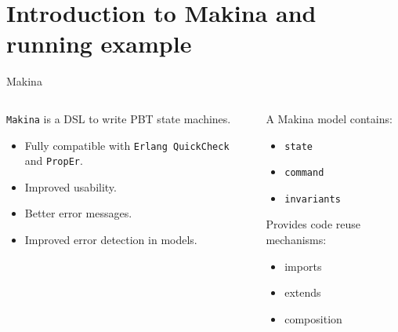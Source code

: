 \documentclass[aspectratio=169, 10pt]{beamer}
\begin{document}
\section{Introduction to Makina and running example}
\label{sec:org9d1ef4c}
\begin{frame}[label={sec:org6fdfc9e},fragile]{Makina}
 \begin{columns}
\begin{column}{0.48\columnwidth}
\onslide<+->
\texttt{Makina} is a DSL to write PBT state machines.
\onslide<+->
\begin{itemize}
\item Fully compatible with \texttt{Erlang QuickCheck} and \texttt{PropEr}.
\onslide<+->
\item Improved usability.
\onslide<+->
\item Better error messages.
\onslide<+->
\item Improved error detection in models.
\end{itemize}
\end{column}

\begin{column}{0.48\columnwidth}
\onslide<+->
A Makina model contains:
\onslide<+->
\begin{itemize}
\item \texttt{state}
\onslide<+->
\item \texttt{command}
\onslide<+->
\item \texttt{invariants}
\onslide<+->
\end{itemize}

\vspace{10pt}

Provides code reuse mechanisms:
\onslide<+->
\begin{itemize}
\item imports
\onslide<+->
\item extends
\onslide<+->
\item composition
\end{itemize}
\end{column}
\end{columns}
\end{frame}
\end{document}
